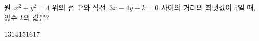 원~$x^2+y^2=4$ 위의 점~$\mathrm{P}$와 직선~$3x-4y+k=0$ 사이의 거리의 최댓값이 $5$일 때, 양수 $k$의 값은?
\begin{choices32}{$13$}{$14$}{$15$}{$16$}{$17$}\end{choices32}
